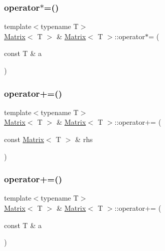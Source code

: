 \mbox{\label{classMatrix_a9ac358ade86c1b442aa75852b2dd663a_a9ac358ade86c1b442aa75852b2dd663a}} 
\subsubsection{\texorpdfstring{operator$\ast$=()}{operator*=()}\hspace{0.1cm}{\footnotesize\ttfamily [2/2]}}
{\footnotesize\ttfamily template$<$typename T$>$ \\
\mbox{\hyperlink{classMatrix}{Matrix}}$<$ T $>$ \& \mbox{\hyperlink{classMatrix}{Matrix}}$<$ T $>$\+::operator$\ast$= (\begin{DoxyParamCaption}\item[{const T \&}]{a }\end{DoxyParamCaption})\hspace{0.3cm}{\ttfamily [inline]}}

\mbox{\label{classMatrix_a36fdb87d0aa1b906eda9fa1cf81a1477_a36fdb87d0aa1b906eda9fa1cf81a1477}} 
\subsubsection{\texorpdfstring{operator+=()}{operator+=()}\hspace{0.1cm}{\footnotesize\ttfamily [1/2]}}
{\footnotesize\ttfamily template$<$typename T$>$ \\
\mbox{\hyperlink{classMatrix}{Matrix}}$<$ T $>$ \& \mbox{\hyperlink{classMatrix}{Matrix}}$<$ T $>$\+::operator+= (\begin{DoxyParamCaption}\item[{const \mbox{\hyperlink{classMatrix}{Matrix}}$<$ T $>$ \&}]{rhs }\end{DoxyParamCaption})\hspace{0.3cm}{\ttfamily [inline]}}

\mbox{\label{classMatrix_a5aeaf1a90547b2288646d57143d5518c_a5aeaf1a90547b2288646d57143d5518c}} 
\subsubsection{\texorpdfstring{operator+=()}{operator+=()}\hspace{0.1cm}{\footnotesize\ttfamily [2/2]}}
{\footnotesize\ttfamily template$<$typename T$>$ \\
\mbox{\hyperlink{classMatrix}{Matrix}}$<$ T $>$ \& \mbox{\hyperlink{classMatrix}{Matrix}}$<$ T $>$\+::operator+= (\begin{DoxyParamCaption}\item[{const T \&}]{a }\end{DoxyParamCaption})\hspace{0.3cm}{\ttfamily [inline]}}


